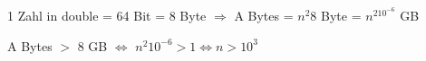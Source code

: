 1 Zahl in double = 64 Bit = 8 Byte 
$\Rightarrow$ A Bytes = $n^2$8 Byte = $n^210^{-6}$ GB


A Bytes $>$ 8 GB $\Leftrightarrow$ $n^2 10 ^{-6} > 1 \Leftrightarrow n>10^3$ 
